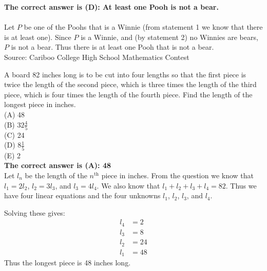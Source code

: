 \documentclass{article}
\begin{document}

\textbf{The correct answer is (D): At least one Pooh is not a bear.\\}\\[1 ex]
Let $P$ be one of the Poohs that is a Winnie (from statement 1 we know that there is at least one). Since $P$ is a Winnie, and (by statement 2) no Winnies are bears, $P$ is not a bear.  Thus there is at least one Pooh that is not a bear.
\\[5 ex]

\scriptsize
Source: Cariboo College High School Mathematics Contest

\normalsize
A board 82 inches long is to be cut into four lengths so that the first piece is twice the length of the second piece, which is three times the length of the third piece, which is four times the length of the fourth piece. Find the length of the longest piece in inches.\\
(A) 48\\
(B) $32\frac{4}{5}$\\
(C) 24\\
(D) $8\frac{1}{5}$\\
(E) 2\\


\textbf{The correct answer is (A): 48}\\[1 ex]
Let $l_{n}$ be the length of the $n^{\mathrm {th}}$ piece in inches. From the question we know that $l_1=2l_2$, $l_2=3l_3$, and $l_3=4l_4$.  We also know that $l_{1}+l_{2}+l_{3}+l_{4}=82$.  Thus we have four linear equations and the four unknowns $l_1$, $l_2$, $l_3$, and $l_4$.

Solving these gives:
\begin{align*}
l_{4}&=2\\
l_{3}&=8\\
l_{2}&=24\\
l_{1}&=48
\end{align*}
Thus the longest piece is 48 inches long.
\\[5 ex]
\end{document}
